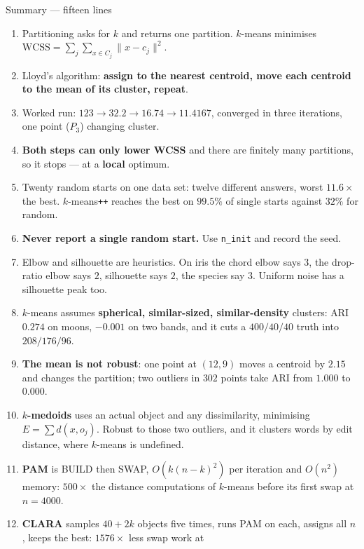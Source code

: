 \documentclass[aspectratio=169]{beamer}
\begin{document}
\begin{frame}[shrink=17]{Summary --- fifteen lines}
  \begin{enumerate}\small
    \item Partitioning asks for $k$ and returns one partition. $k$-means
      minimises $\mathrm{WCSS} = \sum_j \sum_{x \in C_j}\lVert x-c_j\rVert^2$.
    \item Lloyd's algorithm: \textbf{assign to the nearest centroid, move
      each centroid to the mean of its cluster, repeat}.
    \item Worked run: $123 \to 32.2 \to 16.74 \to 11.4167$, converged in
      three iterations, one point ($P_3$) changing cluster.
    \item \textbf{Both steps can only lower WCSS} and there are finitely
      many partitions, so it stops --- at a \textbf{local} optimum.
    \item Twenty random starts on one data set: twelve different answers,
      worst $11.6\times$ the best. $k$-means\texttt{++} reaches the best on
      $99.5\%$ of single starts against $32\%$ for random.
    \item \textbf{Never report a single random start.} Use
      \texttt{n\_init} and record the seed.
    \item Elbow and silhouette are heuristics. On iris the chord elbow says
      $3$, the drop-ratio elbow says $2$, silhouette says $2$, the species
      say $3$. Uniform noise has a silhouette peak too.
    \item $k$-means assumes \textbf{spherical, similar-sized,
      similar-density} clusters: ARI $0.274$ on moons, $-0.001$ on two
      bands, and it cuts a $400/40/40$ truth into $208/176/96$.
    \item \textbf{The mean is not robust}: one point at $(12,9)$ moves a
      centroid by $2.15$ and changes the partition; two outliers in $302$
      points take ARI from $1.000$ to $0.000$.
    \item \textbf{$k$-medoids} uses an actual object and any dissimilarity,
      minimising $E = \sum d(x, o_j)$. Robust to those two outliers, and it
      clusters words by edit distance, where $k$-means is undefined.
    \item \textbf{PAM} is BUILD then SWAP, $O(k(n-k)^2)$ per iteration and
      $O(n^2)$ memory: $500\times$ the distance computations of
      $k$-means before its first swap at $n = 4000$.
    \item \textbf{CLARA} samples $40+2k$ objects five times, runs PAM on
      each, assigns all $n$, keeps the best: $1576\times$ less swap work at

\end{enumerate}
\end{frame}
\end{document}
